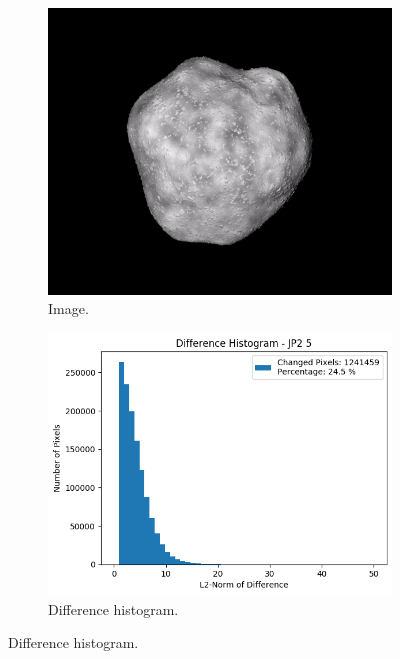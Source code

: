 \begin{figure}[htb]
    \centering
    \begin{subfigure}[b]{0.48\textwidth}
        \centering
        \includegraphics[width=\textwidth]{doc/thesis/0_figures/compare_quality/set1/jp2_5.png}
        \caption{Image.}
        \label{fig:img_quality_comp_jp2_5_orig}
    \end{subfigure}
    \begin{subfigure}[b]{0.48\textwidth}
        \centering
        \includegraphics[width=\textwidth]{doc/thesis/0_figures/compare_quality/set1/jp2_5_diff_histogram.png}
        \caption{Difference histogram.}

\end{subfigure}
\end{figure}
